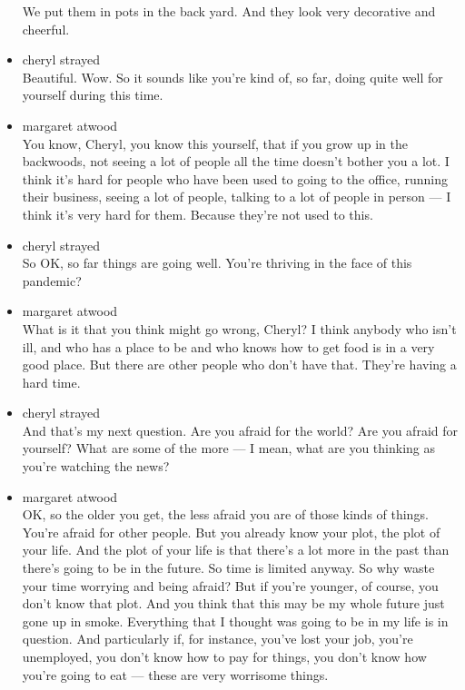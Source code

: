 \begin{itemize}
  We put them in pots in the back yard. And they look very decorative
  and cheerful.
\item
  cheryl strayed\\
  Beautiful. Wow. So it sounds like you're kind of, so far, doing quite
  well for yourself during this time.
\item
  margaret atwood\\
  You know, Cheryl, you know this yourself, that if you grow up in the
  backwoods, not seeing a lot of people all the time doesn't bother you
  a lot. I think it's hard for people who have been used to going to the
  office, running their business, seeing a lot of people, talking to a
  lot of people in person --- I think it's very hard for them. Because
  they're not used to this.
\item
  cheryl strayed\\
  So OK, so far things are going well. You're thriving in the face of
  this pandemic?
\item
  margaret atwood\\
  What is it that you think might go wrong, Cheryl? I think anybody who
  isn't ill, and who has a place to be and who knows how to get food is
  in a very good place. But there are other people who don't have that.
  They're having a hard time.
\item
  cheryl strayed\\
  And that's my next question. Are you afraid for the world? Are you
  afraid for yourself? What are some of the more --- I mean, what are
  you thinking as you're watching the news?
\item
  margaret atwood\\
  OK, so the older you get, the less afraid you are of those kinds of
  things. You're afraid for other people. But you already know your
  plot, the plot of your life. And the plot of your life is that there's
  a lot more in the past than there's going to be in the future. So time
  is limited anyway. So why waste your time worrying and being afraid?
  But if you're younger, of course, you don't know that plot. And you
  think that this may be my whole future just gone up in smoke.
  Everything that I thought was going to be in my life is in question.
  And particularly if, for instance, you've lost your job, you're
  unemployed, you don't know how to pay for things, you don't know how
  you're going to eat --- these are very worrisome things.


\end{itemize}
